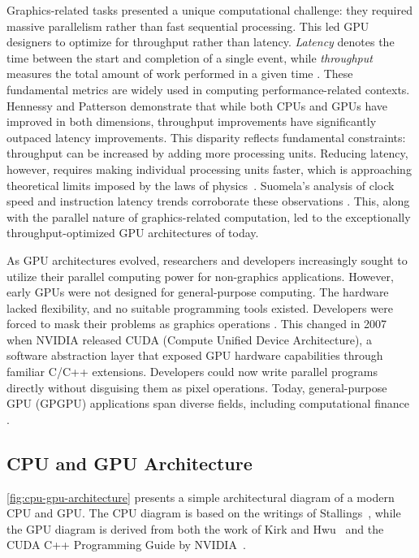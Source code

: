 \documentclass[english,12pt,a4paper,pdftex,sci,utf8]{aaltothesis}
\begin{document}
Graphics-related tasks presented a unique computational challenge: they required massive parallelism rather than fast sequential processing. This led GPU designers to optimize for throughput rather than latency. \emph{Latency} denotes the time between the start and completion of a single event, while \emph{throughput} measures the total amount of work performed in a given time \cite{hennessy2011computer}. These fundamental metrics are widely used in computing performance-related contexts. Hennessy and Patterson \cite{hennessy2011computer} demonstrate that while both CPUs and GPUs have improved in both dimensions, throughput improvements have significantly outpaced latency improvements. This disparity reflects fundamental constraints: throughput can be increased by adding more processing units. Reducing latency, however, requires making individual processing units faster, which is approaching theoretical limits imposed by the laws of physics~\cite{hennessy2011computer, sanders2010cuda}. Suomela's analysis of clock speed and instruction latency trends corroborate these observations \cite{suomela_ppc}. This, along with the parallel nature of graphics-related computation, led to the exceptionally throughput-optimized GPU architectures of today.

As GPU architectures evolved, researchers and developers increasingly sought to utilize their parallel computing power for non-graphics applications. However, early GPUs were not designed for general-purpose computing. The hardware lacked flexibility, and no suitable programming tools existed. Developers were forced to mask their problems as graphics operations \cite{sanders2010cuda, kirk2016programming}. This changed in 2007 when NVIDIA released CUDA (Compute Unified Device Architecture), a software abstraction layer that exposed GPU hardware capabilities through familiar C/C++ extensions. Developers could now write parallel programs directly without disguising them as pixel operations. Today, general-purpose GPU (GPGPU) applications span diverse fields, including computational finance \cite{sanders2010cuda, kirk2016programming}.
\clearpage

\subsection{CPU and GPU Architecture}
 \cref{fig:cpu-gpu-architecture} presents a simple architectural diagram of a modern CPU and GPU. The CPU diagram is based on the writings of Stallings~\cite{stallings2011operating}, while the GPU diagram is derived from both the work of Kirk and Hwu~\cite{kirk2016programming} and the CUDA C++ Programming Guide by NVIDIA~\cite{cuda2025guide}.
\end{document}
